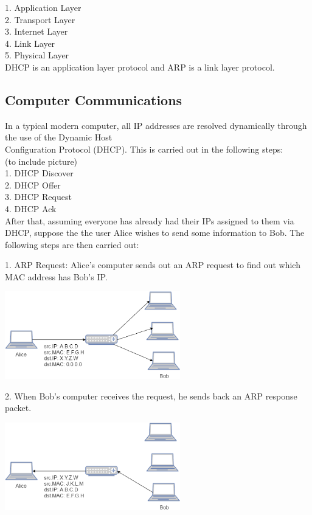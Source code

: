 \documentclass{acm_proc_article-sp}
\begin{document}
1. Application Layer\\
2. Transport Layer\\
3. Internet Layer\\
4. Link Layer\\
5. Physical Layer\\

DHCP is an application layer protocol and ARP is a link layer protocol.

\subsection{Computer Communications}
In a typical modern computer, all IP addresses are resolved dynamically through the use of the Dynamic Host \\Configuration Protocol (DHCP). This is carried out in the following steps: \\
(to include picture) \\
1. DHCP Discover \\
2. DHCP Offer \\
3. DHCP Request \\
4. DHCP Ack \\ 

After that, assuming everyone has already had their IPs assigned to them via DHCP, suppose the the user Alice wishes to send some information to Bob. The following steps are then carried out: 

1. ARP Request: Alice's computer sends out an ARP request to find out which MAC address has Bob's IP. 

\includegraphics[width=3in]{ARP_Request.eps}

2. When Bob's computer receives the request, he sends back an ARP response packet. 

\includegraphics[width=3in]{ARP_Response.eps}
\end{document}
